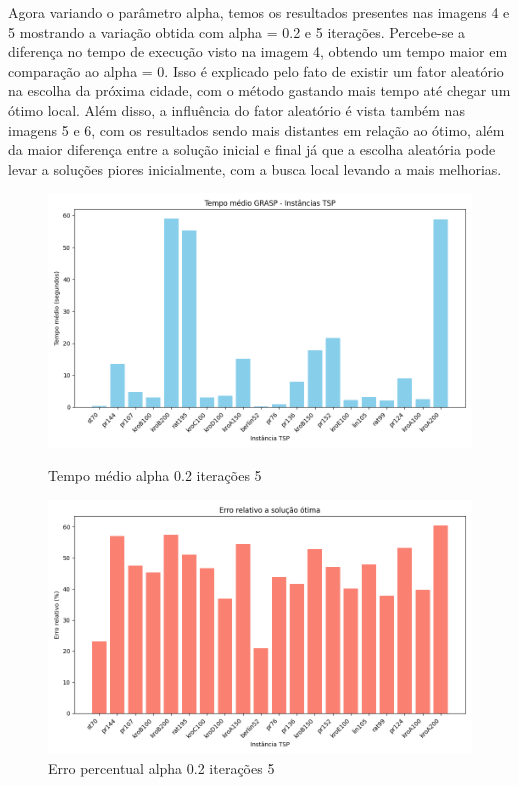 \documentclass[10pt]{extarticle} %
\begin{document}
Agora variando o parâmetro alpha, temos os resultados presentes nas imagens 4 e 5 mostrando a variação obtida com alpha = 0.2 e 5 iterações. Percebe-se a diferença no tempo de execução visto na imagem 4, obtendo um tempo maior em comparação ao alpha = 0. Isso é explicado pelo fato de existir um fator aleatório na escolha da próxima cidade, com o método gastando mais tempo até chegar um ótimo local. Além disso, a influência do fator aleatório é vista também nas imagens 5 e 6, com os resultados sendo mais distantes em relação ao ótimo, além da maior diferença entre a solução inicial e final já que a escolha aleatória pode levar a soluções piores inicialmente, com a busca local levando a mais melhorias.

\begin{figure}[H]
    \centering
        \begin{minipage}{0.5\textwidth}
        \centering
        \includegraphics[width=1\textwidth]{./plots/average_times_saida_02_5.log.png}
        \caption{Tempo médio alpha 0.2 iterações 5}
        \label{fig:Tempo médio alpha 0.2 iterações 5}
    \end{minipage}\hfill
    \begin{minipage}{0.5\textwidth}
        \centering
        \includegraphics[width=1.0\textwidth]{./plots/solution_comparison_saida_02_5.log.png}
        \caption{Erro percentual alpha 0.2 iterações 5}
        \label{fig:Erro percentual alpha 0.2 iterações 5}
    \end{minipage}
\end{figure}
\end{document}
